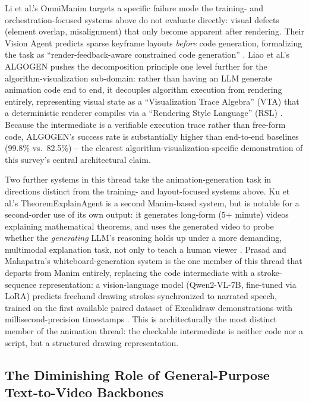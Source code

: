 \documentclass[journal]{IEEEtran}
\begin{document}
Li et al.'s OmniManim targets a specific failure mode the training- and orchestration-focused systems above do not evaluate directly: visual defects (element overlap, misalignment) that only become apparent after rendering. Their Vision Agent predicts sparse keyframe layouts \emph{before} code generation, formalizing the task as ``render-feedback-aware constrained code generation'' \cite{li2026omnimanim}. Liao et al.'s ALGOGEN pushes the decomposition principle one level further for the algorithm-visualization sub-domain: rather than having an LLM generate animation code end to end, it decouples algorithm execution from rendering entirely, representing visual state as a ``Visualization Trace Algebra'' (VTA) that a deterministic renderer compiles via a ``Rendering Style Language'' (RSL) \cite{liao2026algogen}. Because the intermediate is a verifiable execution trace rather than free-form code, ALGOGEN's success rate is substantially higher than end-to-end baselines (99.8\% vs.\ 82.5\%) -- the clearest algorithm-visualization-specific demonstration of this survey's central architectural claim.

Two further systems in this thread take the animation-generation task in directions distinct from the training- and layout-focused systems above. Ku et al.'s TheoremExplainAgent is a second Manim-based system, but is notable for a second-order use of its own output: it generates long-form (5+ minute) videos explaining mathematical theorems, and uses the generated video to probe whether the \emph{generating} LLM's reasoning holds up under a more demanding, multimodal explanation task, not only to teach a human viewer \cite{ku2025theoremexplainagent}. Prasad and Mahapatra's whiteboard-generation system is the one member of this thread that departs from Manim entirely, replacing the code intermediate with a stroke-sequence representation: a vision-language model (Qwen2-VL-7B, fine-tuned via LoRA) predicts freehand drawing strokes synchronized to narrated speech, trained on the first available paired dataset of Excalidraw demonstrations with millisecond-precision timestamps \cite{prasad2026whiteboard}. This is architecturally the most distinct member of the animation thread: the checkable intermediate is neither code nor a script, but a structured drawing representation.

\subsection{The Diminishing Role of General-Purpose Text-to-Video Backbones}
\end{document}
